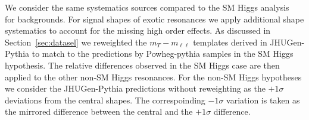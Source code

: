 We consider the same systematics sources compared to the 
SM Higgs analysis~\cite{HWWHCP2012} for backgrounds. 
For signal shapes of exotic resonances we apply additional 
shape systematics to account for the missing high order effects. 
As discussed in Section~\ref{sec:datasel} we reweighted the $m_T-m_{\ell\ell}$ templates 
derived in JHUGen-Pythia to match to the predictions by Powheg-pythia samples in 
the SM Higgs hypothesis. 
The relative differences observed in the SM Higgs case are then 
applied to the other non-SM Higgs resonances. 
For the non-SM Higgs hypotheses we consider the JHUGen-Pythia 
predictions without reweighting as the $+1\sigma$ deviations from the central shapes. 
The correspoinding $-1\sigma$ variation is taken as the mirrored difference between 
the central and the $+1\sigma$ difference. 

